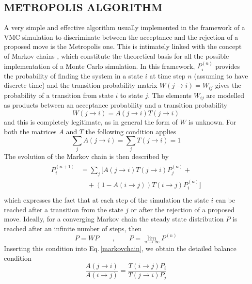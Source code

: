 \subsection{METROPOLIS ALGORITHM}
A very simple and effective algorithm usually implemented in the framework of a VMC simulation to discriminate between the acceptance and the rejection of a proposed move is the Metropolis one. This is intimately linked with the concept of Markov chains \cite{markov}, which constitute the theoretical basis for all the possible implementation of a Monte Carlo simulation. In this framework, $P_i^{(n)}$ provides the probability of finding the system in a state $i$ at time step $n$ (assuming to have discrete time) and the transition probability matrix $W(j \rightarrow i) = W_{ij}$ gives the probability of a transition from state $i$ to state $j$. The elements $W_{ij}$ are modelled as products between an acceptance probability and a transition probability
\begin{equation*}
    W(j\rightarrow i) = A(j\rightarrow i) T(j\rightarrow i)
\end{equation*}
and this is completely legitimate, as in general the form of $W$ is unknown. For both the matrices $A$ and $T$ the following condition applies
\begin{equation*}
    \sum_j A(j\rightarrow i) = \sum_j T(j\rightarrow i) = 1
\end{equation*}
The evolution of the Markov chain is then described by
\begin{align}
\begin{split}
    P_i^{(n+1)} &= \sum_j \bigg[ A(j\rightarrow i) T(j\rightarrow i) P_j^{(n)} + \\
    &\quad + (1 - A(i\rightarrow j)) T(i\rightarrow j) P_i^{(n)} \bigg] \\
\end{split}
\label{markovchain}
\end{align}
which expresses the fact that at each step of the simulation the state $i$ can be reached after a transition from the state $j$ or after the rejection of a proposed move. Ideally, for a converging Markov chain the steady state distribution $P$ is reached after an infinite number of steps, then
\begin{equation*}
    P=WP \qquad, \qquad P = \lim_{n\rightarrow \infty} P^{(n)}
\end{equation*}
Inserting this condition into Eq.\,\ref{markovchain}, we obtain the detailed balance condition
\begin{equation}
    \frac{A(j\rightarrow i)}{A(i\rightarrow j)} =  \frac{ T(i\rightarrow j) P_i}{T(j\rightarrow i) P_j}
    \label{metropolis_ratio}
\end{equation}
